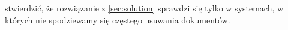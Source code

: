 \begin{enumerate}
stwierdzić, że rozwiązanie z \ref{sec:solution} sprawdzi się tylko w systemach, w których nie spodziewamy się częstego usuwania dokumentów.
\end{enumerate}